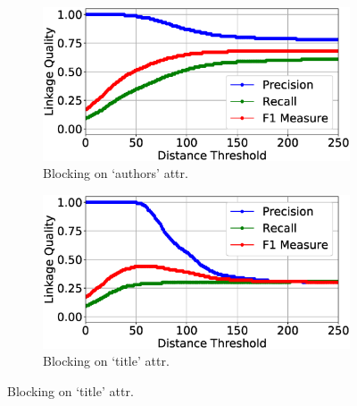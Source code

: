 \documentclass{llncs}
\begin{document}
\begin{figure}
\begin{subfigure}{.5\textwidth}
  \centering
\includegraphics[width=\textwidth]{figures/plotLQ-cora-trad-authors}
\vspace{-6mm}
\caption{Blocking on `authors' attr.}
\end{subfigure}%
\begin{subfigure}{.5\textwidth}
  \centering
\includegraphics[width=\textwidth]{figures/plotLQ-cora-trad-title}
\vspace{-6mm}
\caption{Blocking on `title' attr.}
\end{subfigure} \vspace{5mm}


\end{figure}
\end{document}
